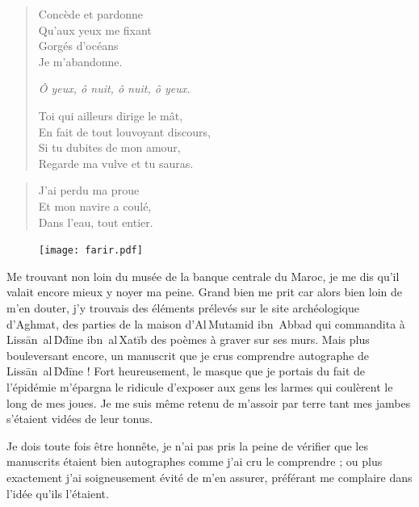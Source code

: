 \begin{verse}
  Concède et pardonne\\  %
  Qu’aux yeux me fixant\\  %
  Gorgés d’océans\\  %
  Je m’abandonne.

  \emph{Ô yeux, ô nuit, ô nuit, ô yeux.}

  Toi qui ailleurs dirige le mât,\\  %
  En fait de tout louvoyant discours,\\  %
  Si tu dubites de mon amour,\\  %
  Regarde ma vulve et tu sauras.
\end{verse}

\begin{verse}%
  \haiku
  J’ai perdu ma proue\\  %
  Et mon navire a coulé,\\  %
  Dans l’eau, tout entier.
\end{verse}

\begin{figure}[h]
  \centering
  \texttt{[image: farir.pdf]}
  \captionsetup{labelformat=empty}
  \caption[Idéotexte du  (\textarabic{خالي})]{}
\end{figure}

\begin{prose}
  Me trouvant non loin du musée de la banque centrale du Maroc, je me dis qu’il valait encore mieux y noyer ma peine. Grand bien me prit car alors  bien loin de m’en douter, j’y trouvais des éléments prélevés sur le site archéologique d’Aghmat, des parties de la maison d’Al\,Mutamid ibn~Abbad qui commandita à Lissān~al\,Ḋḋīne ibn~al\,Xatīb des poèmes à graver sur ses murs. Mais plus bouleversant encore, un manuscrit que je crus comprendre autographe de Lissān~al\,Ḋḋīne ! Fort heureusement, le masque que je portais du fait de l’épidémie m’épargna le ridicule d’exposer aux gens les larmes qui coulèrent le long de mes joues. Je me suis même retenu de m’assoir par terre tant mes jambes s’étaient vidées de leur tonus.

  Je dois toute fois être honnête, je n’ai pas pris la peine de vérifier que les manuscrits étaient bien autographes comme j’ai cru le comprendre ; ou plus exactement j’ai soigneusement évité de m’en assurer, préférant me complaire dans l’idée qu’ils l’étaient.
\end{prose}

